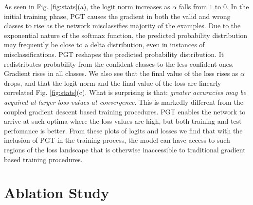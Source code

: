 \documentclass[times,sort&compress]{elsarticle}
\begin{document}
As seen in Fig. \ref{fig:stats}(a), the logit norm increases as $\alpha$ falls from $1$
to $0$. In the initial training phase, PGT causes the gradient in both the valid and
wrong classes to rise as the network misclassifies majority of the examples. Due to the
exponential nature of the softmax function, the predicted probability distribution may
frequently be close to a delta distribution, even in instances of misclassifications.
PGT reshapes the predicted probability distribution. It redistributes probability from
the confident classes to the less confident ones. Gradient rises in all classes. We also
see that the final value of the loss rises as $\alpha$ drops, and that the logit norm
and the final value of the loss are linearly correlated Fig. \ref{fig:stats}(c). What is
surprising is that: \textit{greater accuracies may be acquired at larger loss values at
convergence}. This is markedly different from the coupled gradient descent based
training procedures. PGT enables the network to arrive at such optima where the loss
values are high, but both training and test perfomance is better. From these plots of
logits and losses we find that with the inclusion of PGT in the training process, the
model can have access to such regions of the loss landscape that is otherwise
inaccessible to traditional gradient based training procedures.







\section{Ablation Study}
\label{sec:Abla}
\end{document}
